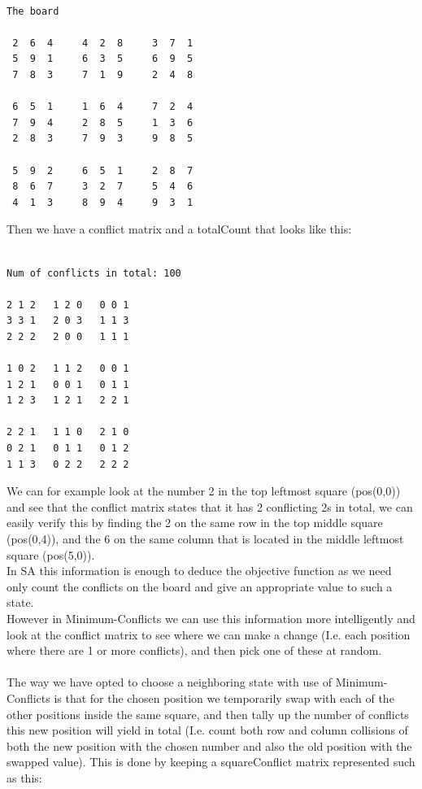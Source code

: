 \documentclass[12pt, a4paper]{article}
\begin{document}
\begin{verbatim}

The board

 2  6  4     4  2  8     3  7  1 
 5  9  1     6  3  5     6  9  5 
 7  8  3     7  1  9     2  4  8 

 6  5  1     1  6  4     7  2  4 
 7  9  4     2  8  5     1  3  6 
 2  8  3     7  9  3     9  8  5 

 5  9  2     6  5  1     2  8  7 
 8  6  7     3  2  7     5  4  6 
 4  1  3     8  9  4     9  3  1 

\end{verbatim}

\noindent
Then we have a conflict matrix and a totalCount that looks like this:

\begin{verbatim}

Num of conflicts in total: 100

2 1 2 	1 2 0 	0 0 1 
3 3 1 	2 0 3 	1 1 3 
2 2 2 	2 0 0 	1 1 1 

1 0 2 	1 1 2 	0 0 1 
1 2 1 	0 0 1 	0 1 1 
1 2 3 	1 2 1 	2 2 1 

2 2 1 	1 1 0 	2 1 0 
0 2 1 	0 1 1 	0 1 2 
1 1 3 	0 2 2 	2 2 2 

\end{verbatim}
\noindent
We can for example look at the number 2 in the top leftmost square (pos(0,0)) and see that the conflict matrix states that it has 2 conflicting 2s in total, we can easily verify this by finding the 2 on the same row in the top middle square (pos(0,4)), and the 6 on the same column that is located in the middle leftmost
square (pos(5,0)).
\\
In SA this information is enough to deduce the objective function as we need only count the conflicts on the board and give an appropriate value to such a state. \\
However in Minimum-Conflicts we can use this information more intelligently and look at the conflict matrix to see where we can make a change (I.e. each position where there are 1 or more conflicts), and then pick one of these at random.
\\\\
The way we have opted to choose a neighboring state with use of Minimum-Conflicts is that for the chosen position we temporarily swap with each of the other positions inside the same square, and then tally up the number of conflicts this new position will yield in total (I.e. count both row and column collisions of both the new position with the chosen number and also the old position with the swapped value). This is done by keeping a squareConflict matrix represented such as this:
\end{document}
